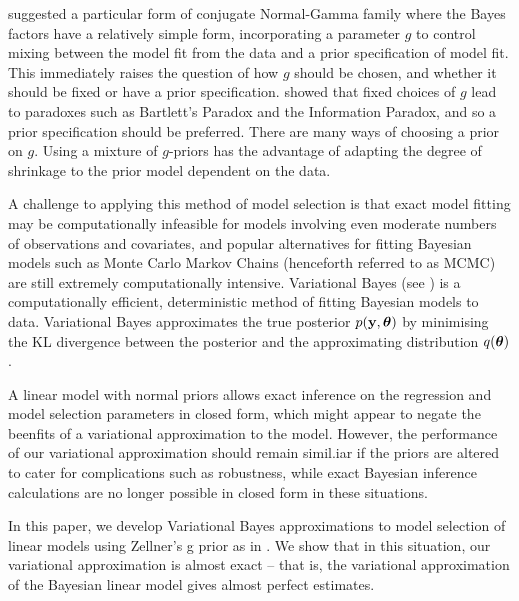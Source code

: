 \documentclass{amsart}[12pt]
\begin{document}
\cite{Zellner1980} suggested a particular form of conjugate Normal-Gamma family where the Bayes factors have a
relatively simple form, incorporating a parameter $g$ to control mixing between the model fit from the data
and a prior specification of model fit. This immediately raises the question of how $g$ should be chosen, and
whether it should be fixed or have a prior specification. \cite{Liang2008} showed that fixed choices of $g$
lead to paradoxes such as Bartlett's Paradox and the Information Paradox, and so a prior specification should
be preferred. There are many ways of choosing a prior on $g$. Using a mixture of $g$-priors has the advantage
of adapting the degree of shrinkage to the prior model dependent on the data.



A challenge to applying this method of model selection is that exact model fitting may be computationally
infeasible for models involving even moderate numbers of observations and covariates, and popular alternatives
for fitting Bayesian models such as Monte Carlo Markov Chains (henceforth referred to as MCMC) are still
extremely computationally intensive. Variational Bayes (see \cite{Ormerod2010}) is a computationally
efficient, deterministic method of fitting Bayesian models to data. Variational Bayes approximates the true
posterior $p({\bf y}, {\boldsymbol \theta})$ by minimising the KL divergence between the posterior and the  approximating
distribution $q({\boldsymbol \theta})$.

A linear model with normal priors allows exact inference on the regression and model selection parameters in
closed form, which might appear to negate the beenfits of a variational approximation to the model. However,
the performance of our variational approximation should remain simil.iar if the priors are altered to cater
for complications such as robustness, while exact Bayesian inference calculations are no longer possible
in closed form in these situations.






In this paper, we develop Variational Bayes approximations to model selection of linear models using Zellner's
g prior as in \cite{Liang2008}. We show that in this situation, our variational approximation is almost exact
-- that is, the variational approximation of the Bayesian linear model gives almost perfect estimates.
\end{document}
